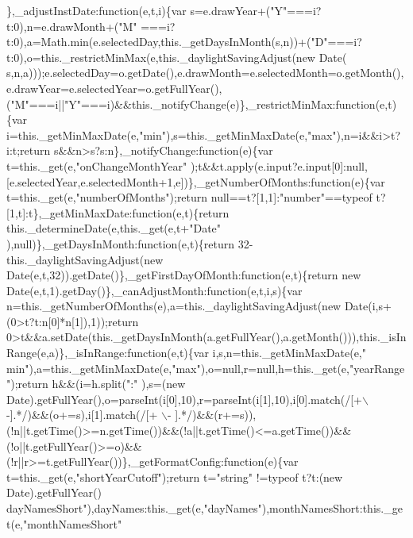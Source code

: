 \begin{DoxyCode}
{      \},\_adjustInstDate:function(e,t,i)\{var s=e.drawYear+("}Y\textcolor{stringliteral}{"===i?t:0),n=e.drawMonth+("}M\textcolor{stringliteral}{"
      ===i?t:0),a=Math.min(e.selectedDay,this.\_getDaysInMonth(s,n))+("}D\textcolor{stringliteral}{"===i?t:0),o=this.\_restrictMinMax(e,this.\_daylightSavingAdjust(new
       Date(
      s,n,a)));e.selectedDay=o.getDate(),e.drawMonth=e.selectedMonth=o.getMonth(),e.drawYear=e.selectedYear=o.getFullYear(),("}M\textcolor{stringliteral}{"===i||"}Y\textcolor{stringliteral}{"===i)&&this.\_notifyChange(e)\},\_restrictMinMax:function(e,t)\{var
       i=this.\_getMinMaxDate(e,"}min\textcolor{stringliteral}{"),s=this.\_getMinMaxDate(e,"}max\textcolor{stringliteral}{"),n=i&&i>t?i:t;return s&&n>s?s:n\},\_notifyChange:function(e)\{var
       t=this.\_get(e,"}onChangeMonthYear\textcolor{stringliteral}{"
      );t&&t.apply(e.input?e.input[0]:null,[e.selectedYear,e.selectedMonth+1,e])\},\_getNumberOfMonths:function(e)\{var t=this.\_get(e,"}numberOfMonths\textcolor{stringliteral}{");return null==t?[1,1]:"}number\textcolor{stringliteral}{"==typeof
       t?[1,t]:t\},\_getMinMaxDate:function(e,t)\{return this.\_determineDate(e,this.\_get(e,t+"}Date\textcolor{stringliteral}{"
      ),null)\},\_getDaysInMonth:function(e,t)\{return 32-this.\_daylightSavingAdjust(new
       Date(e,t,32)).getDate()\},\_getFirstDayOfMonth:function(e,t)\{return new Date(e,t,1).getDay()\},\_canAdjustMonth:function(e,t,i,s)\{var
       n=this.\_getNumberOfMonths(e),a=this.\_daylightSavingAdjust(new Date(i,s+(0>t?t:n[0]*n[1]),1));return
       0>t&&a.setDate(this.\_getDaysInMonth(a.getFullYear(),a.getMonth())),this.\_isInRange(e,a)\},\_isInRange:function(e,t)\{var i,s,n=this.\_getMinMaxDate(e,"}
      min\textcolor{stringliteral}{"),a=this.\_getMinMaxDate(e,"}max\textcolor{stringliteral}{"),o=null,r=null,h=this.\_get(e,"}yearRange\textcolor{stringliteral}{");return h&&(i=h.split("}:\textcolor{stringliteral}{"
      ),s=(new Date).getFullYear(),o=parseInt(i[0],10),r=parseInt(i[1],10),i[0].match(/[+\(\backslash\)-].*/)&&(o+=s),i[1].match(/[+
      \(\backslash\)-
      ].*/)&&(r+=s)),(!n||t.getTime()>=n.getTime())&&(!a||t.getTime()<=a.getTime())&&(!o||t.getFullYear()>=o)&&(!r||r>=t.getFullYear())\},\_getFormatConfig:function(e)\{var t=this.\_get(e,"}shortYearCutoff\textcolor{stringliteral}{");return t="}\textcolor{keywordtype}{string}\textcolor{stringliteral}{"
      !=typeof t?t:(new Date).getFullYear()%
      dayNamesShort\textcolor{stringliteral}{"),dayNames:this.\_get(e,"}dayNames\textcolor{stringliteral}{"),monthNamesShort:this.\_get(e,"}monthNamesShort\textcolor{stringliteral}{"
}}
\end{DoxyCode}
